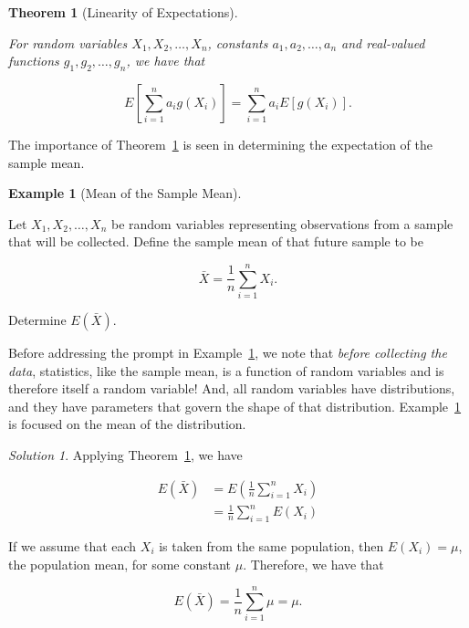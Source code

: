 \documentclass[
  letterpaper,
  DIV=11,
  numbers=noendperiod]{scrreprt}
\theoremstyle{definition}
\theoremstyle{plain}
\newtheorem{theorem}{Theorem}[chapter]
\theoremstyle{definition}
\newtheorem{example}{Example}[chapter]
\theoremstyle{remark}
\newtheorem*{solution}{Solution}
\begin{document}
\begin{theorem}[Linearity of
Expectations]\protect\hypertarget{thm-linearity-of-expectations}{}\label{thm-linearity-of-expectations}

For random variables \(X_1, X_2, \dotsc, X_n\), constants
\(a_1, a_2, \dotsc, a_n\) and real-valued functions
\(g_1, g_2, \dotsc, g_n\), we have that

\[E\left[\sum_{i=1}^{n} a_i g\left(X_i\right)\right] = \sum_{i=1}^{n} a_i E\left[g\left(X_i\right)\right].\]

\end{theorem}

The importance of Theorem~\ref{thm-linearity-of-expectations} is seen in
determining the expectation of the sample mean.

\begin{example}[Mean of the Sample
Mean]\protect\hypertarget{exm-mean-xbar}{}\label{exm-mean-xbar}

Let \(X_1, X_2, \dotsc, X_n\) be random variables representing
observations from a sample that will be collected. Define the sample
mean of that future sample to be

\[\bar{X} = \frac{1}{n} \sum_{i=1}^{n} X_i.\]

Determine \(E\left(\bar{X}\right)\).

\end{example}

Before addressing the prompt in Example~\ref{exm-mean-xbar}, we note
that \emph{before collecting the data}, statistics, like the sample
mean, is a function of random variables and is therefore itself a random
variable! And, all random variables have distributions, and they have
parameters that govern the shape of that distribution.
Example~\ref{exm-mean-xbar} is focused on the mean of the distribution.

\begin{solution}
Applying Theorem~\ref{thm-linearity-of-expectations}, we have

\[
\begin{aligned}
  E\left(\bar{X}\right)
    &= E\left(\frac{1}{n} \sum_{i=1}^{n} X_i\right) \\
    &= \frac{1}{n} \sum_{i=1}^{n} E\left(X_i\right)
\end{aligned}
\]

If we assume that each \(X_i\) is taken from the same population, then
\(E\left(X_i\right) = \mu\), the population mean, for some constant
\(\mu\). Therefore, we have that

\[E\left(\bar{X}\right) = \frac{1}{n} \sum_{i=1}^{n} \mu = \mu.\]
\end{solution}
\end{document}
